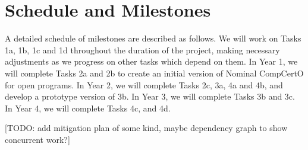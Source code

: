 \section{Schedule and Milestones}

A detailed schedule of milestones are described as follows.
We will work on Tasks 1a, 1b, 1c and 1d throughout the duration of the project,
making necessary adjustments as we progress on other tasks
which depend on them.
In Year 1, 
we will complete Tasks 2a and 2b to
create an initial version of Nominal CompCertO for open programs.
In Year 2, we will complete Tasks 2c, 3a, 4a and 4b, and
develop a prototype version of 3b.
In Year 3, 
we will complete Tasks 3b and 3c.
In Year 4, we will complete Tasks 4c, and 4d.

[TODO: add mitigation plan of some kind,
maybe dependency graph to show concurrent work?]

